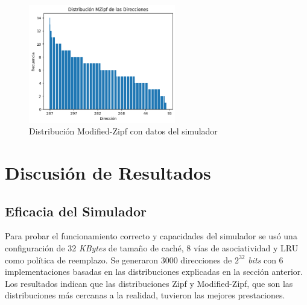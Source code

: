 \documentclass[12pt]{article}
\begin{document}
\begin{figure}[h]
	\centering
	\includegraphics[width=0.57\textwidth]{mzipf.png}
	\caption{Distribución Modified-Zipf con datos del simulador}
	\label{fig:mzipf_dist}
\end{figure}
%
\section*{Discusión de Resultados}
%
\subsection*{Eficacia del Simulador}
\vspace{-5pt}
Para probar el funcionamiento correcto y capacidades del simulador se usó una configuración de 32 \textit{KBytes} de tamaño de caché, 8 vías de asociatividad y LRU como política de reemplazo. Se generaron 3000 direcciones de $2^{32}$ \textit{bits} con 6 implementaciones basadas en las distribuciones explicadas en la sección anterior. Los resultados indican que las distribuciones Zipf y Modified-Zipf, que son las distribuciones más cercanas a la realidad\cite{hefeeda_traffic_2008}, tuvieron las mejores prestaciones.
\newline
\end{document}
